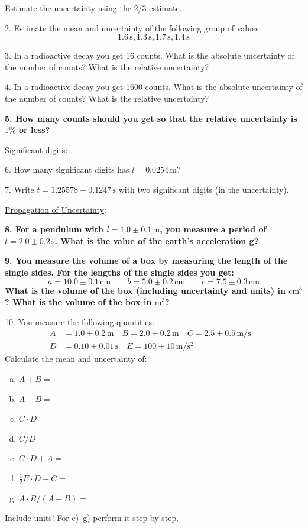 Estimate the uncertainty using the 2/3 estimate. \myskip

2. Estimate the mean and uncertainty of the following group of values:
\begin{equation*}
    1.6\,\mathrm{s}, 1.3\,\mathrm{s}, 1.7\,\mathrm{s}, 1.4\,\mathrm{s}
\end{equation*}

3. In a radioactive decay you get 16 counts. What is the absolute uncertainty of the number of counts? What is the relative uncertainty? \myskip

4. In a radioactive decay you get 1600 counts. What is the absolute uncertainty of the number of counts? What is the relative uncertainty? \myskip

{\bf{5. How many counts should you get so that the relative uncertainty is $1\%$ or less? }}\myskip

\noindent \underline{Significant digits}: \myskip

6. How many significant digits has $l = 0.0254\,\mathrm{m}$? \myskip

7. Write $t = 1.25578 \pm 0.1247\,\mathrm{s}$ with two significant digits (in the uncertainty). \myskip

\noindent \underline{Propagation of Uncertainty}: \myskip

{\bf{8. For a pendulum with $l = 1.0 \pm 0.1\,\mathrm{m}$, you measure a period of $t = 2.0 \pm 0.2\,\mathrm{s}$. What is the value of the earth's acceleration g?}} \myskip

{\bf{9. You measure the volume of a box by measuring the length of the single sides. For the lengths of the single sides you get:
\begin{equation*}
    a = 10.0 \pm 0.1\,\mathrm{cm}\qquad    b = 5.0 \pm 0.2\,\mathrm{cm} \qquad c = 7.5 \pm 0.3\,\mathrm{cm}
\end{equation*}
What is the volume of the box (including uncertainty and units) in $\mathrm{cm}^3$? What is the volume of the box in $\mathrm{m}^3$? }}\myskip

10. You measure the following quantities:
\begin{align*}
    A &= 1.0 \pm 0.2\,\mathrm{m}\quad B = 2.0 \pm 0.2\,\mathrm{m}\quad        C = 2.5 \pm 0.5\,\mathrm{m/s} \\ 
    D &= 0.10\pm 0.01\,\mathrm{s}\quad E = 100\pm 10\,\mathrm{m/s^2} &
\end{align*}
Calculate the mean and uncertainty of:
\begin{enumerate}[a)]
    \item $A+B=$
    \item $A-B=$
    \item $C\cdot D=$
    \item $C/D=$
    \item $C\cdot D + A=$
    \item $\frac{1}{2}E\cdot D + C=$
    \item $A\cdot B/(A-B)=$
\end{enumerate}
Include units! For e)--g) perform it step by step.\myskip

